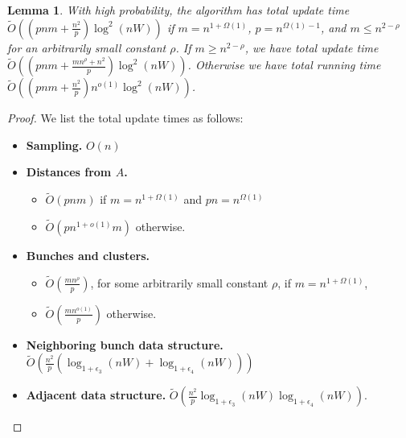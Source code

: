 \documentclass[11pt]{article}
\newtheorem{lemma}[theorem]{Lemma}
\theoremstyle{definition}
\theoremstyle{remark}
\begin{document}
\begin{titlepage}
\begin{lemma}\label{lm:mult_time}
    With high probability, the algorithm \DynAPSPtwo has total update time $ \tilde O ((pnm + \tfrac{n^2}{ p})\log^2(nW)) $ if $m=n^{1+\Omega(1)}$, $p=n^{\Omega(1)-1}$, and $m\leq n^{2-\rho}$ for an arbitrarily small constant $\rho$. If $m\geq n^{2-\rho}$, we have total update time $ \tilde O ((pnm + \tfrac{mn^ \rho+n^2}{ p})\log^2(nW)) $. Otherwise we have total running time $ \tilde O ((pnm + \tfrac{n^2}{ p})n^{o(1)}\log^2(nW)) $.
\end{lemma}
\begin{proof}
    We list the total update times as follows:
\begin{itemize}
    \item \textbf{Sampling.} $O(n)$
    \item \textbf{Distances from $A$.}
    \begin{itemize}
	\item $\tilde{O}(pnm)$ if $m=n^{1+\Omega(1)}$ and $pn=n^{\Omega(1)}$
	\item $\tilde O(pn^{1+o(1)}m)$ otherwise.
    \end{itemize}
    \item \textbf{Bunches and clusters.} 
    \begin{itemize}
	\item $ \tilde O (\tfrac{mn^\rho}{p}) $, for some arbitrarily small constant $\rho$, if $m=n^{1+\Omega(1)}$, 
	\item $\tilde O(\tfrac{mn^{o(1)}}{p})$ otherwise.
    \end{itemize}
   \item \textbf{Neighboring bunch data structure.} $ \tilde O (\tfrac{n^2}{p} (\log_{1+\epsilon_3}(nW)+\log_{1+\epsilon_4}(nW))) $
   \item \textbf{Adjacent data structure.} $ \tilde O (\tfrac{n^2}{p}\log_{1+\epsilon_3}(nW)\log_{1+\epsilon_4}(nW)) $.

\end{itemize}
\end{proof}
\end{titlepage}
\end{document}
